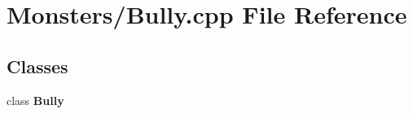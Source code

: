 \section{Monsters/\-Bully.cpp File Reference}
\label{_bully_8cpp}
\subsection*{Classes}
\begin{DoxyCompactItemize}
\item 
class {\bf Bully}
\end{DoxyCompactItemize}
